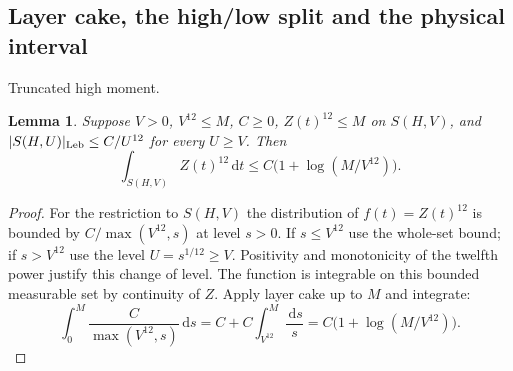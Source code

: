 \documentclass[11pt,a4paper]{article}
\numberwithin{equation}{section}
\newtheorem{lemma}[theorem]{Lemma}
\theoremstyle{definition}
\newcommand{\dd}{\,\mathrm d}
\newcommand{\zabs}{Z}
\begin{document}
\subsection{Layer cake, the high/low split and the physical interval}
\par\medskip\noindent Truncated high moment.
\begin{lemma}\label{lem:highmoment}
Suppose $V>0$, $V^{12}\le M$, $C\ge0$, $\zabs(t)^{12}\le M$ on $S(H,V)$,
and $|S(H,U)|_{\rm Leb}\le C/U^{12}$ for every $U\ge V$.
Then
\[
 \int_{S(H,V)}\zabs(t)^{12}\dd t
       \le C\bigl(1+\log(M/V^{12})\bigr).
\]
\end{lemma}
\begin{proof}
For the restriction to $S(H,V)$ the distribution of $f(t)=\zabs(t)^{12}$
is bounded by $C/\max(V^{12},s)$ at level $s>0$. If $s\le V^{12}$ use
the whole-set bound; if $s>V^{12}$ use the level
$U=s^{1/12}\ge V$. Positivity and monotonicity of the twelfth power justify
this change of level. The function is integrable on this bounded measurable
set by continuity of $\zabs$. Apply layer cake up to $M$ and integrate:
\[
 \int_0^M\frac C{\max(V^{12},s)}\dd s
       =C+C\int_{V^{12}}^M\frac{\dd s}s
       =C\bigl(1+\log(M/V^{12})\bigr).
\]
\end{proof}
\end{document}
